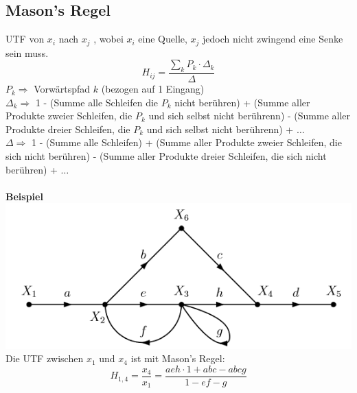 \subsection{Mason's Regel}
UTF von $x_i$ nach $x_j$ , wobei $x_i$ eine Quelle, $x_j$ jedoch nicht zwingend eine Senke sein muss.
\[
H_{ij} = \frac{\sum_{k}P_k\cdot\Delta_k}{\Delta}
\]
$P_k \Rightarrow$ Vorwärtspfad $k$ (bezogen auf 1 Eingang)\\
$\Delta_k \Rightarrow $ 1 - (Summe alle Schleifen die $P_k$ nicht berühren) + (Summe aller Produkte zweier Schleifen, die $P_k$ und sich selbst nicht berührenn) - (Summe aller Produkte dreier Schleifen, die $P_k$ und sich selbst nicht berührenn) + $\dots$\\
$\Delta \Rightarrow $ 1 - (Summe alle Schleifen) + (Summe aller Produkte zweier Schleifen, die sich nicht berühren) - (Summe aller Produkte dreier Schleifen, die sich nicht berühren) + $\dots$\\
~\\ \textbf{Beispiel}\\
\includegraphics[width=\columnwidth]{Images/sfd_beispiel}
Die UTF zwischen $x_1$ und $x_4$ ist mit Mason's Regel:
\[
H_{1,4} = \frac{x_4}{x_1} = \frac{aeh \cdot 1 + abc - abcg}{1 - ef - g}
\]

